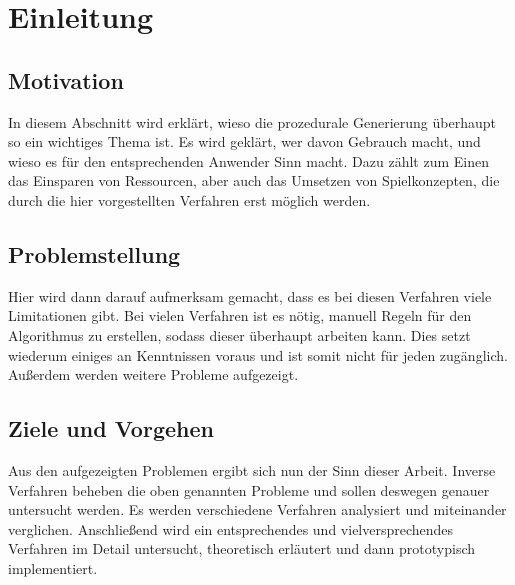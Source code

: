 %
\chapter{Einleitung}
\section{Motivation}
In diesem Abschnitt wird erklärt, wieso die prozedurale Generierung überhaupt so ein wichtiges Thema ist.
Es wird geklärt, wer davon Gebrauch macht, und wieso es für den entsprechenden Anwender Sinn macht. Dazu zählt
zum Einen das Einsparen von Ressourcen, aber auch das Umsetzen von Spielkonzepten, die durch die hier vorgestellten
Verfahren erst möglich werden.

\section{Problemstellung}
Hier wird dann darauf aufmerksam gemacht, dass es bei diesen Verfahren viele Limitationen gibt. Bei vielen Verfahren
ist es nötig, manuell Regeln für den Algorithmus zu erstellen, sodass dieser überhaupt arbeiten kann. Dies setzt wiederum
einiges an Kenntnissen voraus und ist somit nicht für jeden zugänglich. Außerdem werden weitere Probleme aufgezeigt.

\section{Ziele und Vorgehen}
Aus den aufgezeigten Problemen ergibt sich nun der Sinn dieser Arbeit. Inverse Verfahren beheben die oben genannten Probleme
und sollen deswegen genauer untersucht werden. Es werden verschiedene Verfahren analysiert und miteinander verglichen.
Anschließend wird ein entsprechendes und vielversprechendes Verfahren im Detail untersucht, theoretisch erläutert und
dann prototypisch implementiert.